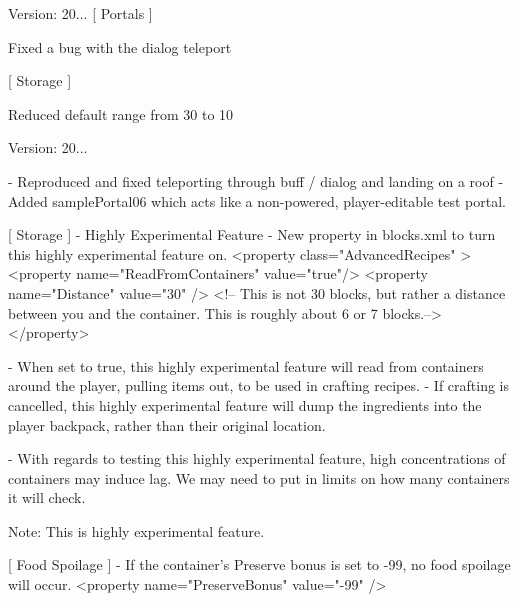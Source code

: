 Version\+: 20... \mbox{[} Portals \mbox{]}
\begin{DoxyItemize}
\item Fixed a bug with the dialog teleport
\end{DoxyItemize}

\mbox{[} Storage \mbox{]}
\begin{DoxyItemize}
\item Reduced default range from 30 to 10
\end{DoxyItemize}

Version\+: 20... \begin{DoxyVerb}[ Portals ]
    - Reproduced and fixed teleporting through buff / dialog and landing on a roof
    - Added samplePortal06 which acts like a non-powered, player-editable test portal.

[ Storage ]
    - Highly Experimental Feature
    - New property in blocks.xml to turn this highly experimental feature on.
        <property class="AdvancedRecipes" >
            <property name="ReadFromContainers" value="true"/>
            <property name="Distance" value="30" />  <!-- This is not 30 blocks, but rather a distance between you and the container. This is roughly about 6 or 7 blocks.-->
        </property>

    - When set to true, this highly experimental feature will read from containers around the player, pulling items out, to be used in crafting recipes.
        - If crafting is cancelled, this highly experimental feature will dump the ingredients into the player backpack, rather than their original location.

    - With regards to testing this highly experimental feature, high concentrations of containers may induce lag. We may need to put in limits on how many containers it will check.

    Note: This is highly experimental feature. 

[ Food Spoilage ]
    - If the container's Preserve bonus is set to -99, no food spoilage will occur.
        <property name="PreserveBonus" value="-99" />
\end{DoxyVerb}


